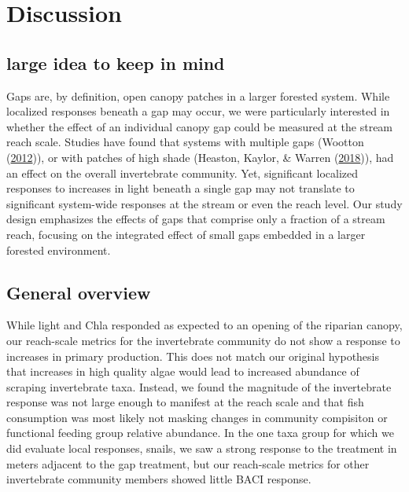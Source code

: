 \documentclass[double,12pt]{beavtex}
\begin{document}
  \chapter*{Discussion}\label{discussion}
  
  \section*{large idea to keep in mind}\label{large-idea-to-keep-in-mind}
  
  Gaps are, by definition, open canopy patches in a larger forested
  system. While localized responses beneath a gap may occur, we were
  particularly interested in whether the effect of an individual canopy
  gap could be measured at the stream reach scale. Studies have found that
  systems with multiple gaps (Wootton
  (\protect\hyperlink{ref-Wootton2012}{2012})), or with patches of high
  shade (Heaston, Kaylor, \& Warren
  (\protect\hyperlink{ref-Heaston2018}{2018})), had an effect on the
  overall invertebrate community. Yet, significant localized responses to
  increases in light beneath a single gap may not translate to significant
  system-wide responses at the stream or even the reach level. Our study
  design emphasizes the effects of gaps that comprise only a fraction of a
  stream reach, focusing on the integrated effect of small gaps embedded
  in a larger forested environment.
  
  \section*{General overview}\label{general-overview}
  
  While light and Chla responded as expected to an opening of the riparian
  canopy, our reach-scale metrics for the invertebrate community do not
  show a response to increases in primary production. This does not match
  our original hypothesis that increases in high quality algae would lead
  to increased abundance of scraping invertebrate taxa. Instead, we found
  the magnitude of the invertebrate response was not large enough to
  manifest at the reach scale and that fish consumption was most likely
  not masking changes in community compisiton or functional feeding group
  relative abundance. In the one taxa group for which we did evaluate
  local responses, snails, we saw a strong response to the treatment in
  meters adjacent to the gap treatment, but our reach-scale metrics for
  other invertebrate community members showed little BACI response.
  
\end{document}
